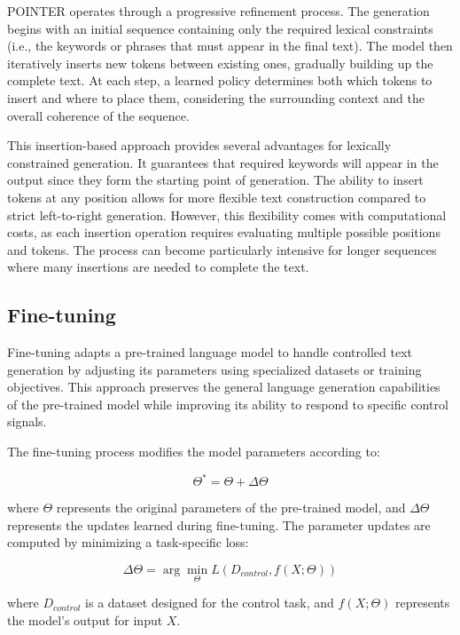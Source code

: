 POINTER operates through a progressive refinement process. 
The generation begins with an initial sequence containing only the required lexical constraints (i.e., the keywords or phrases that must appear in the final text). The model then iteratively inserts new tokens between existing ones, gradually building up the complete text. At each step, a learned policy determines both which tokens to insert and where to place them, considering the surrounding context and the overall coherence of the sequence.

This insertion-based approach provides several advantages for lexically constrained generation. It guarantees that required keywords will appear in the output since they form the starting point of generation. The ability to insert tokens at any position allows for more flexible text construction compared to strict left-to-right generation. However, this flexibility comes with computational costs, as each insertion operation requires evaluating multiple possible positions and tokens. The process can become particularly intensive for longer sequences where many insertions are needed to complete the text.

\subsection{Fine-tuning}

Fine-tuning adapts a pre-trained language model to handle controlled text generation by adjusting its parameters using specialized datasets or training objectives. 
This approach preserves the general language generation capabilities of the pre-trained model while improving its ability to respond to specific control signals.

The fine-tuning process modifies the model parameters according to:

\begin{equation}
    \Theta^* = \Theta + \Delta\Theta
\end{equation}

where $\Theta$ represents the original parameters of the pre-trained model, and $\Delta\Theta$ represents the updates learned during fine-tuning. The parameter updates are computed by minimizing a task-specific loss:

\begin{equation}
    \Delta\Theta = \arg\min_{\Theta} L(D_{control}, f(X; \Theta))
\end{equation}

where $D_{control}$ is a dataset designed for the control task, and $f(X; \Theta)$ represents the model's output for input $X$.

